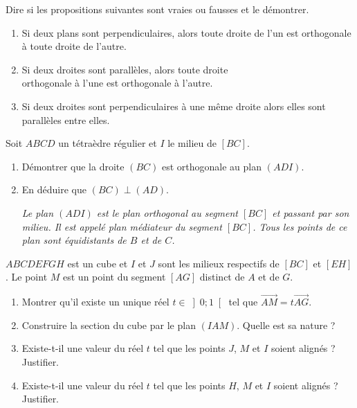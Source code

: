 \documentclass{cornouaille}
\begin{document}
\begin{colonne*exercice}

  \begin{exercice}
    Dire si les propositions suivantes sont vraies ou fausses et le
    démontrer.
    \begin{enumerate}
    \item Si deux plans sont perpendiculaires, alors toute droite de
      l'un est orthogonale à toute droite de l'autre.
    \item Si deux droites sont parallèles, alors toute droite\\
      orthogonale à l'une est orthogonale à l'autre.
    \item Si deux droites sont perpendiculaires à une même droite
      alors elles sont parallèles entre elles.
    \end{enumerate}
  \end{exercice}

  \begin{exercice}
    Soit $ABCD$ un tétraèdre régulier et $I$ le milieu de $[BC]$.

    \begin{center}
      
    \end{center}

    \begin{enumerate}
    \item Démontrer que la droite $(BC)$ est orthogonale au plan
      $(ADI)$.
    \item En déduire que $(BC)\perp(AD)$.

      \textit{Le plan $(ADI)$ est le plan orthogonal au segment $[BC]$
        et passant par son milieu. Il est appelé plan médiateur du
        segment $[BC]$. Tous les points de ce plan sont équidistants
        de $B$ et de $C$.}
    \end{enumerate}
  \end{exercice}

  \begin{exercice}
    $ABCDEFGH$ est un cube et $I$ et $J$ sont les milieux respectifs de
    $[BC]$ et $[EH]$.  Le point $M$ est un point du segment $[AG]$
    distinct de $A$ et de $G$.
    \begin{enumerate}
    \item Montrer qu'il existe un unique réel $t\in\left] 0;1\right[ $
      tel que $\overrightarrow{AM}=t\overrightarrow{AG}$.
    \item Construire la section du cube par le plan $(IAM)$. Quelle
      est sa nature ?
    \item Existe-t-il une valeur du réel $t$ tel que les points $J$,
      $M$ et $I$ soient alignés ? Justifier.
    \item Existe-t-il une valeur du réel $t$ tel que les points $H$,
      $M$ et $I$ soient alignés ? Justifier.
    \end{enumerate}
  \end{exercice}


\end{colonne*exercice}
\end{document}

